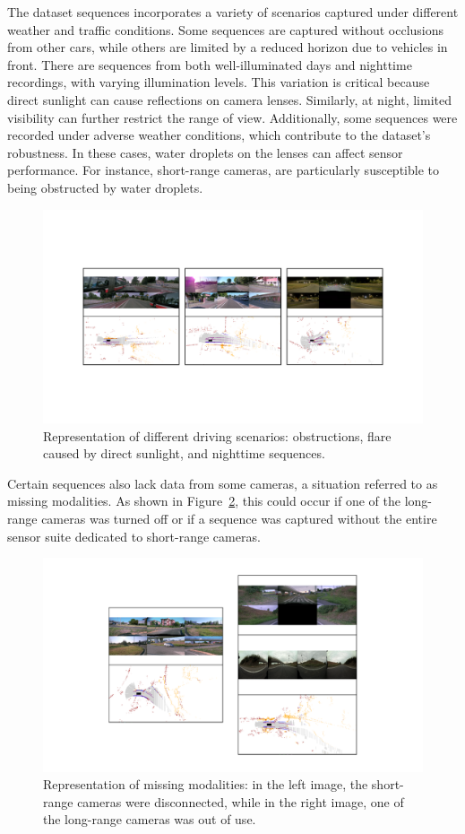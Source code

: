 The dataset sequences incorporates a variety of scenarios captured under different weather and traffic conditions. Some sequences are captured without occlusions from other cars, while others are limited by a reduced horizon due to vehicles in front. There are sequences from both well-illuminated days and nighttime recordings, with varying illumination levels. This variation is critical because direct sunlight can cause reflections on camera lenses. Similarly, at night, limited visibility can further restrict the range of view. Additionally, some sequences were recorded under adverse weather conditions, which contribute to the dataset’s robustness. In these cases, water droplets on the lenses can affect sensor performance. For instance, short-range cameras, are particularly susceptible to being obstructed by water droplets.
\begin{figure}[H]
    \centering
    \includegraphics[width=1\linewidth]{LateX//figs/scenarios.pdf}
    \caption{Representation of different driving scenarios: obstructions, flare caused by direct sunlight, and nighttime sequences.}
    \label{fig:scenarios}
\end{figure}

Certain sequences also lack data from some cameras, a situation referred to as missing modalities. As shown in Figure~\ref{fig:missing_modalities}, this could occur if one of the long-range cameras was turned off or if a sequence was captured without the entire sensor suite dedicated to short-range cameras.
\begin{figure}[H]
    \centering
    \includegraphics[width=0.6\linewidth]{LateX//figs/missing_modalities.pdf}
    \caption{Representation of missing modalities: in the left image, the short-range cameras were disconnected, while in the right image, one of the long-range cameras was out of use.}
    \label{fig:missing_modalities}
\end{figure}

